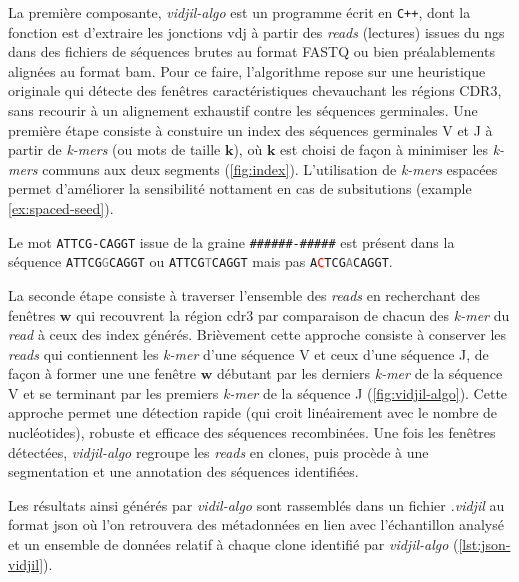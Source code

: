 La première composante, \textit{vidjil-algo} est un programme écrit en \texttt{C++}, dont la fonction est d'extraire 
les jonctions \gls{vdj} à partir des \textit{reads} (lectures) issues du \gls{ngs} dans des fichiers de séquences 
brutes au format FASTQ ou bien préalablements alignées au format \gls{bam}. Pour ce faire, l'algorithme 
repose sur une heuristique originale qui détecte des fenêtres caractéristiques chevauchant les régions CDR3, 
sans recourir à un alignement exhaustif contre les séquences germinales. Une première étape consiste à constuire un index 
des séquences germinales V et J à partir de \textit{k-mers} (ou mots de taille $\mathbf{k}$), où $\mathbf{k}$ est choisi de façon à 
minimiser les \textit{k-mers} communs aux deux segments (\autoref{fig:index}). L'utilisation de \textit{k-mers} espacées permet d'améliorer la sensibilité 
nottament en cas de subsitutions (example \ref{ex:spaced-seed}).

\begin{examplebox}[label={ex:spaced-seed}]
    Le mot \texttt{ATTCG-CAGGT} issue de la graine \texttt{\#\#\#\#\#\#-\#\#\#\#\#} 
    est présent dans la séquence \texttt{ATTCG\textcolor{gray}{G}CAGGT} ou \texttt{ATTCG\textcolor{gray}{T}CAGGT} 
    mais pas \texttt{A\textcolor{red}{C}TCG\textcolor{gray}{A}CAGGT}.
\end{examplebox}


    
La seconde étape consiste à traverser l'ensemble des \textit{reads} en recherchant des fenêtres $\mathbf{w}$ qui recouvrent 
la région \gls{cdr}3 par comparaison de chacun des \textit{k-mer} du \textit{read} à ceux des index générés. Brièvement cette 
approche consiste à conserver les \textit{reads} qui contiennent les \textit{k-mer} d'une séquence V et ceux d'une séquence J, 
de façon à former une une fenêtre $\mathbf{w}$ débutant par les derniers \textit{k-mer} de la séquence V et se terminant 
par les premiers \textit{k-mer} de la séquence J (\autoref{fig:vidjil-algo}).
Cette approche permet une détection rapide (qui croit linéairement avec le nombre de nucléotides), robuste et efficace 
des séquences recombinées. Une fois les fenêtres détectées, \textit{vidjil-algo} regroupe les \textit{reads} en clones, 
puis procède à une segmentation et une annotation des séquences identifiées.



Les résultats ainsi générés par \textit{vidil-algo} sont rassemblés dans un fichier \textit{.vidjil} au format \gls{json} où 
l'on retrouvera des métadonnées en lien avec l'échantillon analysé et un ensemble de données relatif à chaque clone 
identifié par \textit{vidjil-algo} (\autoref{lst:json-vidjil}).

